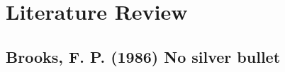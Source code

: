 \documentclass[11pt,a4paper]{report}
\begin{document}

\clearpage\maketitle
\thispagestyle{empty}

\newpage
\tableofcontents{}
\thispagestyle{empty}


\newpage

\chapter{Literature Review}\label{ch:Literature_Review}

\section{Brooks, F. P. (1986) No silver bullet}
\end{document}
